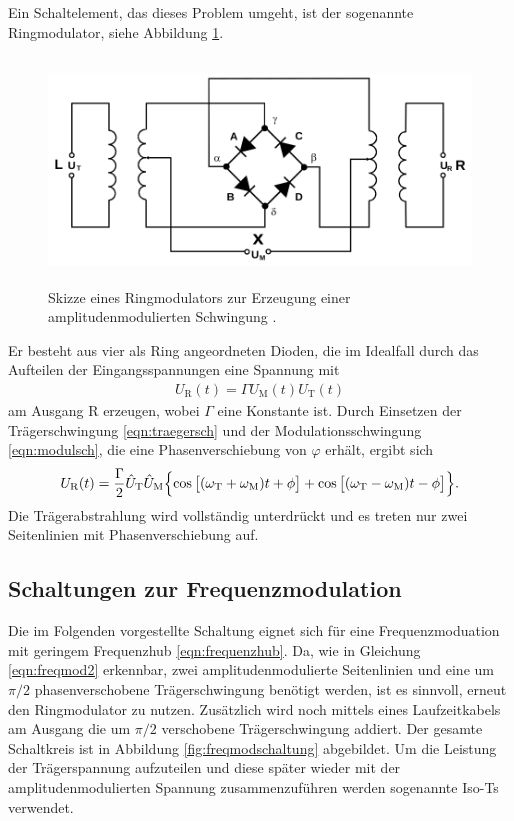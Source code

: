 Ein Schaltelement, das dieses Problem umgeht, ist der sogenannte Ringmodulator, siehe Abbildung \ref{fig:ringamplmodschaltung}.
\begin{figure}
  \centering
  \includegraphics[height=6cm]{JasperErsterSchultag/ringamplmodschaltung.png}
  \caption{Skizze eines Ringmodulators zur Erzeugung einer amplitudenmodulierten Schwingung \cite{anleitung}.}
  \label{fig:ringamplmodschaltung}
\end{figure}
Er besteht aus vier als Ring angeordneten Dioden, die im Idealfall durch das Aufteilen der Eingangsspannungen
eine Spannung mit
\begin{align}
  U_\text{R}(t) = \Gamma U_\text{M}(t) U_\text{T}(t)
\end{align}
am Ausgang R erzeugen, wobei $\Gamma$ eine Konstante ist.
Durch Einsetzen der Trägerschwingung \eqref{eqn:traegersch} und der Modulationsschwingung \eqref{eqn:modulsch}, die eine Phasenverschiebung von $\varphi$
erhält, ergibt sich
\begin{align}
  U_\text{R}(t) = \frac{\Gamma}{2} \hat{U}_\text{T} \hat{U}_\text{M} \Bigl\{\cos{\bigl[(\omega_\text{T}+\omega_\text{M})t + \phi \bigr]} + \cos{\bigl[(\omega_\text{T}-\omega_\text{M})t - \phi \bigr]} \Bigr\}.
\end{align}
Die Trägerabstrahlung wird vollständig unterdrückt und es treten nur zwei Seitenlinien mit Phasenverschiebung auf.

\subsection{Schaltungen zur Frequenzmodulation}

Die im Folgenden vorgestellte Schaltung eignet sich für eine Frequenzmoduation mit geringem Frequenzhub \eqref{eqn:frequenzhub}.
Da, wie in Gleichung \eqref{eqn:freqmod2} erkennbar, zwei amplitudenmodulierte Seitenlinien und eine um $\pi/2$ phasenverschobene Trägerschwingung
benötigt werden, ist es sinnvoll, erneut den Ringmodulator zu nutzen. Zusätzlich wird noch mittels eines Laufzeitkabels am Ausgang die
um $\pi/2$ verschobene Trägerschwingung addiert. Der gesamte Schaltkreis ist in Abbildung \ref{fig:freqmodschaltung} abgebildet.
Um die Leistung der Trägerspannung aufzuteilen und diese später wieder mit der amplitudenmodulierten Spannung zusammenzuführen werden
sogenannte Iso-Ts verwendet.

